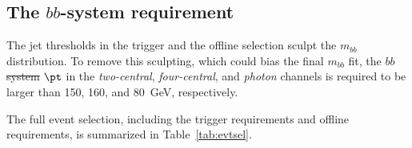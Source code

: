 \documentclass[PAPER, american,coverpage,texlive=2016, english]{\ATLASLATEXPATH atlasdoc}
\providecommand{\DIFadd}[1]{{\protect\color{blue}\uwave{#1}}} %
\providecommand{\DIFdel}[1]{{\protect\color{red}\sout{#1}}}                      %
\providecommand{\DIFaddbegin}{} %
\providecommand{\DIFaddend}{} %
\providecommand{\DIFdelbegin}{} %
\providecommand{\DIFdelend}{} %
\begin{document}
\DIFdelbegin %
\DIFdelend \DIFaddbegin \subsection{ The $bb$-system \pT requirement}
\DIFaddend 

The jet \pT thresholds in the trigger and the offline selection sculpt the $m_{bb}$ distribution.
To remove this sculpting, which could bias the final $m_{bb}$ fit, the $bb$\DIFdelbegin \DIFdel{system }\DIFdelend \DIFaddbegin \DIFadd{-system }\DIFaddend $\pt$ in the \textit{two-central},  \textit{four-central}, and \textit{photon} channels is required to be larger than 150, 160, and \SI{80}{\GeV}, respectively.

The full event selection, including the trigger requirements and offline requirements, is summarized in Table~\ref{tab:evtsel}.
\end{document}
